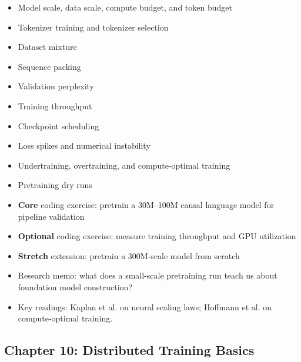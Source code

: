 \documentclass[11pt]{article}
\begin{document}
\begin{itemize}
    \item Model scale, data scale, compute budget, and token budget
    \item Tokenizer training and tokenizer selection
    \item Dataset mixture
    \item Sequence packing
    \item Validation perplexity
    \item Training throughput
    \item Checkpoint scheduling
    \item Loss spikes and numerical instability
    \item Undertraining, overtraining, and compute-optimal training
    \item Pretraining dry runs
    \item \textbf{Core} coding exercise: pretrain a 30M--100M causal language model for pipeline validation
    \item \textbf{Optional} coding exercise: measure training throughput and GPU utilization
    \item \textbf{Stretch} extension: pretrain a 300M-scale model from scratch
    \item Research memo: what does a small-scale pretraining run teach us about foundation model construction?
    \item Key readings: Kaplan et al. on neural scaling laws; Hoffmann et al. on compute-optimal training.
\end{itemize}

\subsection{Chapter 10: Distributed Training Basics}
\end{document}
